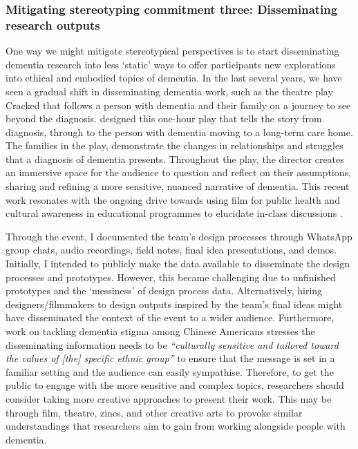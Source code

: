 \subsubsection{Mitigating stereotyping commitment three: Disseminating research outputs}
\label{DiscussionOne:CommitmentThree}
One way we might mitigate stereotypical perspectives is to start disseminating dementia research into less `static' ways to offer participants new explorations into ethical and embodied topics of dementia. In the last several years, we have seen a gradual shift in disseminating dementia work, such as the theatre play Cracked that follows a person with dementia and their family on a journey to see beyond the diagnosis. \cite{kontos_raising_2018}  designed this one-hour play that tells the story from diagnosis, through to the person with dementia moving to a long-term care home. The families in the play, demonstrate the changes in relationships and struggles that a diagnosis of dementia presents. Throughout the play, the director creates an immersive space for the audience to question and reflect on their assumptions, sharing and refining a more sensitive, nuanced narrative of dementia. This recent work resonates with the ongoing drive towards using film for public health and cultural awareness in educational programmes to elucidate in-class discussions \citep{botchway2017films}. 

Through the event, I documented the team's design processes through WhatsApp group chats, audio recordings, field notes, final idea presentations, and demos. Initially, I intended to publicly make the data available to disseminate the design processes and prototypes. However, this became challenging due to unfinished prototypes and the `messiness' of design process data. Alternatively, hiring designers/filmmakers to design outputs inspired by the team’s final ideas might have disseminated the context of the event to a wider audience. Furthermore, \cite{zheng2016exploring} work on tackling dementia stigma among Chinese Americans stresses the disseminating information needs to be \textit{``culturally sensitive and tailored toward the values of [the] specific ethnic group''} to ensure that the message is set in a familiar setting and the audience can easily sympathise. Therefore, to get the public to engage with the more sensitive and complex topics, researchers should consider taking more creative approaches to present their work. This may be through film, theatre, zines, and other creative arts to provoke similar understandings that researchers aim to gain from working alongside people with dementia.

